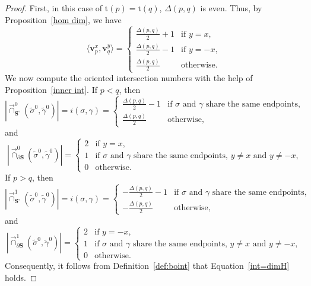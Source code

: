 \documentclass[11pt,a4paper,reqno]{amsart}%
\theoremstyle{plain}
\theoremstyle{definition}
\numberwithin{equation}{section}
\numberwithin{equation}{section}
\def\<{\langle}
\def\>{\rangle}
\def\surf{\mathbf{S}} %
\def\surfi{\surf^\circ}
\newcommand{\bv}{\mathbf{v}}
\newcommand{\typ}[1]{\mathrm{t}(#1)}%
\def\surf{\mathbf{S}}                       %
\begin{document}
\begin{proof}
First, in this case of   $\typ{p}=\typ{q}$,  $\Delta(p,q)$ is even.
  Thus,  by Proposition~\ref{hom dim}, we have
  \[
\<\bv_p^x,\bv_q^y\>=\begin{cases}
\frac{\Delta(p,q)}{2} +1 & \text{if $y=x$},\\
  \frac{\Delta(p,q)}{2} -1 & \text{if $y=-x$},\\
  \frac{\Delta(p,q)}{2}  & \text{otherwise.}
\end{cases}
\]
We now  compute the oriented intersection numbers with the help of Proposition~\ref{inner int}.
 If $p<q$, then
\[|\overrightarrow{\cap}^0_{\surfi}(\widetilde{\sigma}^0 ,\widetilde{\gamma}^0 )|= i({\sigma}, {\gamma} )=\begin{cases}
\frac{\Delta(p,q)}{2}-1  & \text{if  $\sigma$ and $\gamma$ share the same endpoints, 
}\\
  \frac{\Delta(p,q)}{2} &   \text{otherwise,}
\end{cases}
\]
and 
\[
|\overrightarrow{\cap}^0_{\partial\surf}(\widetilde{\sigma}^0 ,\widetilde{\gamma}^0 )|=\begin{cases}
2 & \text{if $y=x$},\\
  1& \text{if  $\sigma$ and $\gamma$ share the same endpoints, $y\ne x$ and $y\ne -x$,}\\
0 & \text{otherwise.}
\end{cases}
\] 
If $p>q$, then 
\[|\overrightarrow{\cap}^1_{\surfi}(\widetilde{\sigma}^0 ,\widetilde{\gamma}^0 )|= i({\sigma},{\gamma} )=\begin{cases}
-\frac{\Delta(p,q)}{2}-1  & \text{if  $\sigma$ and $\gamma$ share the same endpoints, 
}\\
 - \frac{\Delta(p,q)}{2} &   \text{otherwise,}
\end{cases}
\]
and
\[
|\overrightarrow{\cap}^1_{\partial\surf}(\widetilde{\sigma}^0 ,\widetilde{\gamma}^0 )|=\begin{cases}
 2& \text{if $y=-x$},\\
 1& \text{if  $\sigma$ and $\gamma$ share the same endpoints, $y\ne x$ and $y\ne -x$},\\
0  & \text{otherwise.}
\end{cases}
\]
 Consequently,  it follows from Definition~\ref{def:boint}  that Equation~\eqref{int=dimH} holds.
 

\end{proof}
\end{document}

